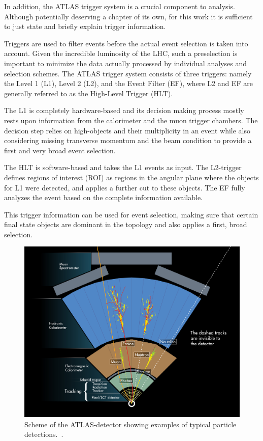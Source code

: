 In addition, the ATLAS trigger system is a crucial component to analysis. Although potentially deserving a chapter of its own, for this work it is sufficient to just state  and briefly explain trigger information.

Triggers are used to filter events before the actual event selection is taken into account. Given the incredible luminosity of the LHC, such a preselection is important to minimize the data actually processed by individual analyses and selection schemes.
The ATLAS trigger system consists of three triggers: namely the Level 1 (L1), Level 2 (L2), and the Event Filter (EF), where L2 and EF are generally referred to as the High-Level Trigger (HLT).

The L1 is completely hardware-based and its decision making process mostly rests upon information from the calorimeter and the muon trigger chambers. The decision step relies on high-\pT objects and their multiplicity in an event while also considering missing transverse momentum and the beam condition to provide a first and very broad event selection.

The HLT is software-based and takes the L1 events as input. The L2-trigger defines regions of interest (ROI) as regions in the angular plane where the objects for L1 were detected, and applies a further cut to these objects.
The EF fully analyzes the event based on the complete information available.

This trigger information can be used for event selection, making sure that certain final state objects are dominant in the topology and also applies a first, broad selection.



\begin{figure}[htbp]
  \centering
  \includegraphics[scale=0.6]{figures_LHC/atlas-abstract}
  \caption[Scheme of the ATLAS detector's detection procedure]{Scheme of the ATLAS-detector showing examples of typical particle detections.~\cite{Pequenao:1095924}.}
  \label{fig:atlas_sketch}
\end{figure}


